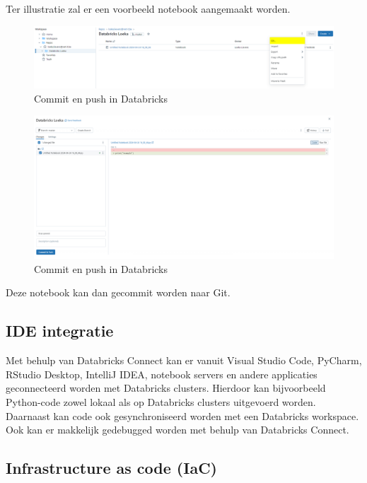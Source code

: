 Ter illustratie zal er een voorbeeld notebook aangemaakt worden.

\begin{figure}[H]
    \centering
    \includegraphics[width=1\textwidth]{./graphics/databricks/git_3.png}
    \caption{Commit en push in Databricks}
\end{figure}

\begin{figure}[H]
    \centering
    \includegraphics[width=1\textwidth]{./graphics/databricks/git_4.png}
    \caption{Commit en push in Databricks}
\end{figure}

Deze notebook kan dan gecommit worden naar Git.

\pagebreak

\subsection{IDE integratie}

Met behulp van Databricks Connect kan er vanuit Visual Studio Code, PyCharm, RStudio Desktop, IntelliJ IDEA, notebook servers en andere applicaties geconnecteerd worden met Databricks clusters. Hierdoor kan bijvoorbeeld Python-code zowel lokaal als op Databricks clusters uitgevoerd worden. Daarnaast kan code ook gesynchroniseerd worden met een Databricks workspace. Ook kan er makkelijk gedebugged worden met behulp van Databricks Connect.

\subsection{Infrastructure as code (IaC)}

